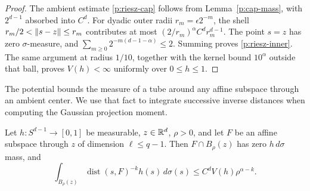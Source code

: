 \begin{proof}
The ambient estimate \eqref{p:riesz-cap} follows from
Lemma~\ref{p:cap-mass}, with $2^{d-1}$ absorbed into $C^d$.
For dyadic outer radii $r_m=\epsilon2^{-m}$, the shell
$r_m/2<\left\lVert s-z\right\rVert\le r_m$ contributes at most
$(2/r_m)^\alpha C^d r_m^{d-1}$. The point $s=z$ has zero
$\sigma$-measure, and
$\sum_{m\ge0}2^{-m(d-1-\alpha)}\le2$. Summing proves
\eqref{p:riesz-inner}. The same argument at radius $1/10$, together
with the kernel bound $10^\alpha$ outside that ball, proves
$V(h)<\infty$ uniformly over $0\le h\le1$.
\end{proof}

The potential bounds the measure of a tube around any affine subspace
through an ambient center. We use that fact to integrate successive
inverse distances when computing the Gaussian projection moment.

\begin{lemma}
\label{p:riesz-distance}
Let $h:S^{d-1}\to[0,1]$ be measurable, $z\in\mathbb R^d$, $\rho>0$,
and let $F$ be an affine subspace through $z$ of dimension
$\ell\le q-1$.  Then $F\cap B_\rho(z)$ has zero $h\,d\sigma$
mass, and
\begin{equation}\label{p:riesz-distance-bound}
 \int_{B_\rho(z)}
       \operatorname{dist}(s,F)^{-k}h(s)\,d\sigma(s)
 \le C^d V(h)\rho^{\alpha-k}.
\end{equation}
\end{lemma}

